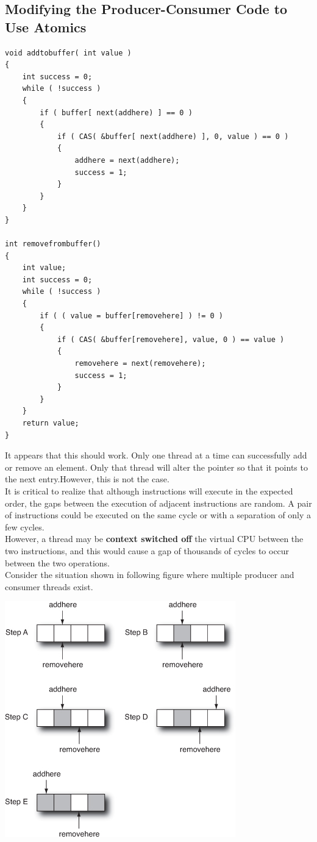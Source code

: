 \documentclass[12pt,a4paper]{report}
\begin{document}
\subsection{Modifying the Producer-Consumer Code to Use Atomics}
\begin{lstlisting}
void addtobuffer( int value )
{
	int success = 0;
	while ( !success )
	{
		if ( buffer[ next(addhere) ] == 0 )
		{
			if ( CAS( &buffer[ next(addhere) ], 0, value ) == 0 )
			{
				addhere = next(addhere);
				success = 1;
			}
		}
	}
}

int removefrombuffer()
{
	int value;
	int success = 0;
	while ( !success )
	{
		if ( ( value = buffer[removehere] ) != 0 )
		{
			if ( CAS( &buffer[removehere], value, 0 ) == value )
			{
				removehere = next(removehere);
				success = 1;
			}
		}
	}
	return value;
}

\end{lstlisting}
It appears that this should work. Only one thread at a time can successfully add or remove an element. Only that thread will alter the pointer so that it points to the next entry.However, this is not the case.
\\
It is critical to realize that although instructions will execute in the expected order, the gaps between the execution of adjacent instructions are random. A pair of instructions could be executed on the same cycle or with a separation of only a few cycles.
\\
However, a thread may be \textbf{context switched off} the virtual CPU between the two instructions, and this would cause a gap of thousands of cycles to occur between the two operations.
\\
Consider the situation shown in following figure where multiple producer and consumer threads exist.
\begin{center}
	\includegraphics{multicore_getfile.jpg}
\end{center}
\end{document}
